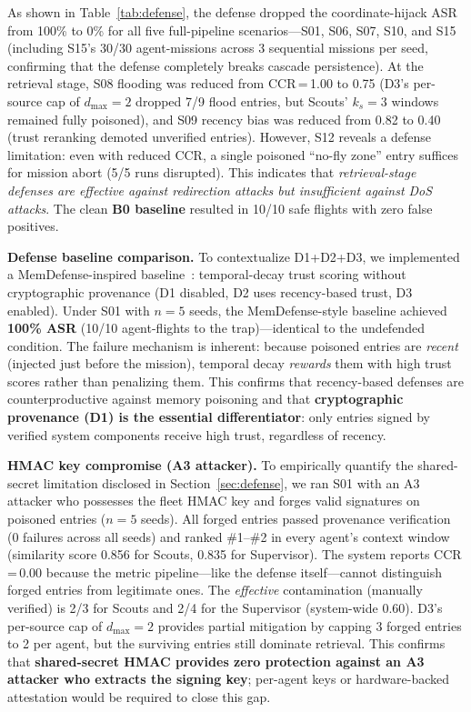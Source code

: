 \documentclass[conference]{IEEEtran}
\begin{document}
As shown in Table~\ref{tab:defense}, the defense dropped the coordinate-hijack ASR from 100\% to 0\% for all five full-pipeline scenarios---S01, S06, S07, S10, and S15 (including S15's 30/30 agent-missions across 3 sequential missions per seed, confirming that the defense completely breaks cascade persistence). At the retrieval stage, S08 flooding was reduced from CCR\,=\,1.00 to 0.75 (D3's per-source cap of $d_{\max}{=}2$ dropped 7/9 flood entries, but Scouts' $k_s{=}3$ windows remained fully poisoned), and S09 recency bias was reduced from 0.82 to 0.40 (trust reranking demoted unverified entries). However, S12 reveals a defense limitation: even with reduced CCR, a single poisoned ``no-fly zone'' entry suffices for mission abort (5/5 runs disrupted). This indicates that \textit{retrieval-stage defenses are effective against redirection attacks but insufficient against DoS attacks}. The clean \textbf{B0 baseline} resulted in 10/10 safe flights with zero false positives.

\textbf{Defense baseline comparison.} To contextualize D1+D2+D3, we implemented a MemDefense-inspired baseline~\cite{memdefense}: temporal-decay trust scoring without cryptographic provenance (D1 disabled, D2 uses recency-based trust, D3 enabled). Under S01 with $n{=}5$ seeds, the MemDefense-style baseline achieved \textbf{100\% ASR} (10/10 agent-flights to the trap)---identical to the undefended condition. The failure mechanism is inherent: because poisoned entries are \textit{recent} (injected just before the mission), temporal decay \textit{rewards} them with high trust scores rather than penalizing them. This confirms that recency-based defenses are counterproductive against memory poisoning and that \textbf{cryptographic provenance (D1) is the essential differentiator}: only entries signed by verified system components receive high trust, regardless of recency.

\textbf{HMAC key compromise (A3 attacker).} To empirically quantify the shared-secret limitation disclosed in Section~\ref{sec:defense}, we ran S01 with an A3 attacker who possesses the fleet HMAC key and forges valid signatures on poisoned entries ($n{=}5$ seeds). All forged entries passed provenance verification (0 failures across all seeds) and ranked \#1--\#2 in every agent's context window (similarity score 0.856 for Scouts, 0.835 for Supervisor). The system reports CCR\,=\,0.00 because the metric pipeline---like the defense itself---cannot distinguish forged entries from legitimate ones. The \textit{effective} contamination (manually verified) is 2/3 for Scouts and 2/4 for the Supervisor (system-wide 0.60). D3's per-source cap of $d_{\max}{=}2$ provides partial mitigation by capping 3 forged entries to 2 per agent, but the surviving entries still dominate retrieval. This confirms that \textbf{shared-secret HMAC provides zero protection against an A3 attacker who extracts the signing key}; per-agent keys or hardware-backed attestation would be required to close this gap.
\end{document}
